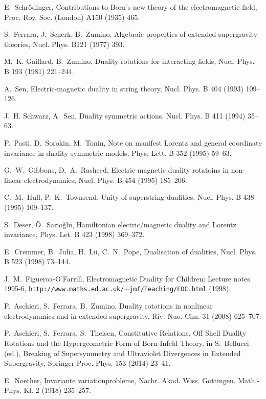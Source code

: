 \documentclass[1p,sort&compress]{elsarticle}
\numberwithin{equation}{section}
\begin{document}
\begin{thebibliography}{999}
E.~Schr\"odinger, {Contributions to Born's new theory of the electromagnetic field},
  Proc. Roy. Soc. (London) A150 (1935) 465.

S.~Ferrara, J.~Scherk, B.~Zumino, {Algebraic properties of extended supergravity
  theories}, Nucl. Phys. B121 (1977) 393.

M.~K. Gaillard, B.~Zumino, {Duality rotations for interacting fields},
  Nucl. Phys. B 193 (1981) 221--244.

A.~Sen, {Electric-magnetic duality in string theory}, Nucl. Phys. B 404 (1993)
  109--126.

J.~H. Schwarz, A.~Sen, {Duality symmetric actions}, Nucl. Phys. B 411 (1994)
  35--63.

P.~Pasti, D.~Sorokin, M.~Tonin, {Note on manifest Lorentz and general coordinate
  invariance in duality symmetric models}, Phys. Lett. B 352 (1995) 59--63.

G.~W.~Gibbons, D.~A.~Rasheed, {Electric-magnetic duality rotatoins in non-linear
  electrodynamics}, Nucl. Phys. B 454 (1995) 185--206.

C.~M.~Hull, P.~K.~Townsend, {Unity of superstring dualities}, Nucl. Phys. B 438 
  (1995) 109--137.

S.~Deser, \"O.~Sario\~glu, {Hamiltonian electric/magnetic duality and Lorentz
  invariance}, Phys. Let. B 423 (1998) 369--372.

E.~Cremmer, B.~Julia, H.~L\"u, C.~N.~Pope, {Dualisation of dualities}, Nucl. Phys. B
 523 (1998) 73--144.

  J.~M.~Figueroa-O'Farrill, {Electromagnetic Duality for Children: Lecture notes 1995-6}, {\tt http://www.maths.ed.ac.uk/$\sim$jmf/Teaching/EDC.html} (1998). 

P.~Aschieri, S.~Ferrara, B.~Zumino, {Duality rotations in nonlinear electrodynamics
  and in extended supergravity}, Riv. Nuo. Cim. 31 (2008) 625--707.

P.~Aschieri, S.~Ferrara, S.~Theisen, {Constitutive Relations, Off Shell Duality 
  Rotations and the Hypergeometric Form of Born-Infeld Theory}, in S.~Bellucci (ed.),
  {Breaking of Supersymmetry and Ultraviolet Divergences in Extended Supergravity}, 
  Springer Proc. Phys. 153 (2014) 23--41.

E.~Noether, {Invariante variationprobleme}, Nachr. Akad. Wiss. Gottingen.
  Math.-Phys. Kl. 2 (1918) 235--257.


\end{thebibliography}
\end{document}
